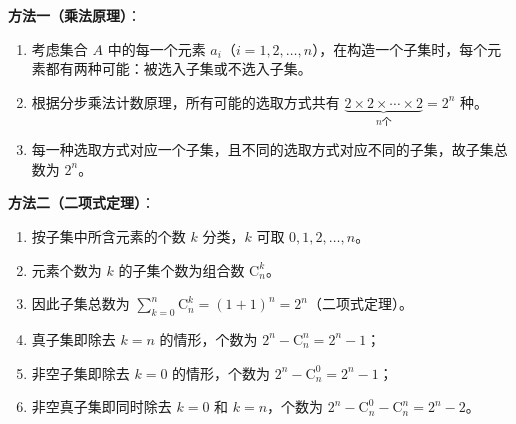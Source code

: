 \begin{proofbox}
\textbf{方法一（乘法原理）}：
\begin{enumerate}
    \item 考虑集合 $A$ 中的每一个元素 $a_i$（$i=1,2,\dots,n$），在构造一个子集时，每个元素都有两种可能：被选入子集或不选入子集。
    \item 根据分步乘法计数原理，所有可能的选取方式共有 $\underbrace{2 \times 2 \times \cdots \times 2}_{n\text{个}} = 2^n$ 种。
    \item 每一种选取方式对应一个子集，且不同的选取方式对应不同的子集，故子集总数为 $2^n$。
\end{enumerate}
\end{proofbox}

\begin{proofbox}
\textbf{方法二（二项式定理）}：
\begin{enumerate}
    \item 按子集中所含元素的个数 $k$ 分类，$k$ 可取 $0,1,2,\dots,n$。
    \item 元素个数为 $k$ 的子集个数为组合数 $\mathrm{C}_n^k$。
    \item 因此子集总数为 $\sum_{k=0}^n \mathrm{C}_n^k = (1+1)^n = 2^n$（二项式定理）。
    \item 真子集即除去 $k=n$ 的情形，个数为 $2^n - \mathrm{C}_n^n = 2^n-1$；
    \item 非空子集即除去 $k=0$ 的情形，个数为 $2^n - \mathrm{C}_n^0 = 2^n-1$；
    \item 非空真子集即同时除去 $k=0$ 和 $k=n$，个数为 $2^n - \mathrm{C}_n^0 - \mathrm{C}_n^n = 2^n-2$。
\end{enumerate}
\end{proofbox}